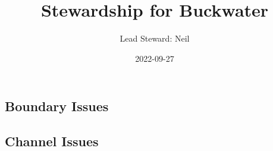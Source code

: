 \documentclass[
  landscape]{article}
\title{Stewardship for Buckwater}
\author{Lead Steward: Neil}
\date{2022-09-27}
\begin{document}
\maketitle

\hypertarget{boundary-issues}{%
\subsection{Boundary Issues}\label{boundary-issues}}

\textbar\textbar{} \textbar\textbar{} \textbar\textbar{}
\textbar\textbar{}

\hypertarget{channel-issues}{%
\subsection{Channel Issues}\label{channel-issues}}
\end{document}
